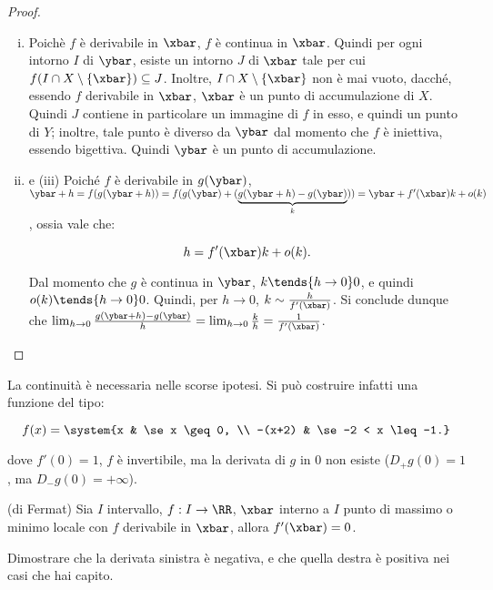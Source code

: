 \documentclass[11pt]{article}
\begin{document}
	\begin{proof}\nl
		\begin{enumerate}[(i)]
			\item Poichè $f$ è derivabile in $\xbar$, $f$ è continua
			in $\xbar$. Quindi per ogni intorno $I$ di $\ybar$, esiste
			un intorno $J$ di $\xbar$ tale per cui $f(I \cap X \setminus \{ \xbar \}) \subseteq J$. Inoltre, $I \cap X \setminus \{\xbar\}$ non
			è mai vuoto, dacché, essendo $f$ derivabile in $\xbar$, $\xbar$ è un punto di accumulazione di $X$. Quindi $J$ contiene in particolare un immagine di $f$ in esso, e quindi un punto di $Y$;
			inoltre, tale punto è diverso da $\ybar$ dal momento che $f$ è
			iniettiva, essendo bigettiva. Quindi $\ybar$ è un punto di accumulazione.
			\item e \!(iii) Poiché $f$ è derivabile in $g(\ybar)$,
			$\ybar + h = f(g(\ybar + h)) = f(g(\ybar) + (\underbrace{g(\ybar + h) - g(\ybar)}_k)) = \ybar + f'(\xbar) k +
			o(k)$, ossia vale che:
			
			\[ h = f'(\xbar) k + o(k). \]
			
			Dal momento che $g$ è continua in $\ybar$, $k \tends{h \to 0} 0$, e
			quindi $o(k) \tends{h \to 0} 0$. Quindi, per $h \to 0$, $k \sim \frac{h}{f'(\xbar)}$. Si conclude
			dunque che $\lim_{h \to 0} \frac{g(\ybar + h) - g(\ybar)}{h} =
			\lim_{h \to 0} \frac{k}{h} = \frac{1}{f'(\xbar)}$.
 		\end{enumerate}
	\end{proof}

	\begin{example}
		La continuità è necessaria nelle scorse ipotesi. Si può costruire
		infatti una funzione del tipo:
		
		\[ f(x) = \system{x & \se x \geq 0, \\ -(x+2) & \se -2 < x \leq -1.} \]
		
		dove $f'(0) = 1$, $f$ è invertibile, ma la derivata di $g$ in $0$ non
		esiste ($D_+ g(0) = 1$, ma $D_- g(0) = +\infty$).
	\end{example}

	\begin{theorem} (di Fermat)
		Sia $I$ intervallo, $f : I \to \RR$, $\xbar$ interno a $I$ punto
		di massimo o minimo locale con $f$ derivabile in $\xbar$, allora
		$f'(\xbar) = 0$.
	\end{theorem}

	\begin{example}
		Dimostrare che la derivata sinistra è negativa, e che quella
		destra è positiva nei casi che hai capito.
	\end{example}
\end{document}
